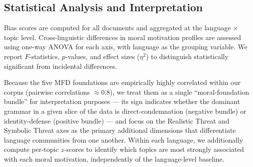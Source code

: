 \documentclass[../CLthesis.tex]{subfiles}
\begin{document}
\subsection{Statistical Analysis and Interpretation}

Bias scores are computed for all documents and aggregated at the language $\times$ topic level. Cross-linguistic differences in moral motivation profiles are assessed using one-way ANOVA for each axis, with language as the grouping variable. We report $F$-statistics, $p$-values, and effect sizes ($\eta^2$) to distinguish statistically significant from incidental differences.

Because the five MFD foundations are empirically highly correlated within our corpus (pairwise correlations $\approx 0.8$), we treat them as a single ``moral-foundation bundle'' for interpretation purposes — its sign indicates whether the dominant grammar in a given slice of the data is direct-condemnation (negative bundle) or identity-defense (positive bundle) — and focus on the Realistic Threat and Symbolic Threat axes as the primary additional dimensions that differentiate language communities from one another. Within each language, we additionally compute per-topic $z$-scores to identify which topics are most strongly associated with each moral motivation, independently of the language-level baseline.
\end{document}
